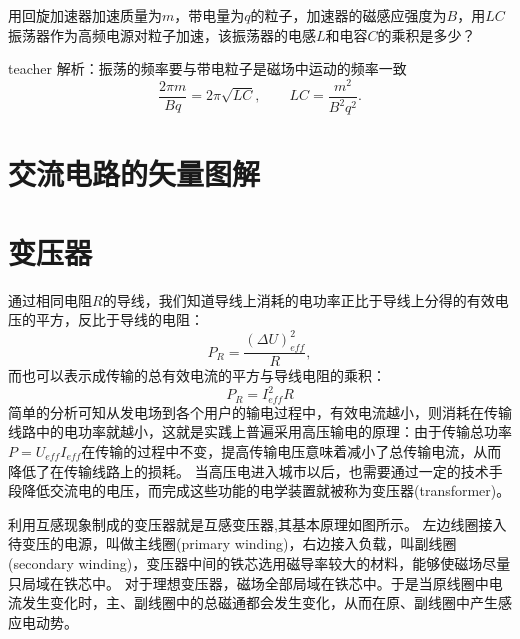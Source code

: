 \begin{example}

用回旋加速器加速质量为$m$，带电量为$q$的粒子，加速器的磁感应强度为$B$，用$LC$振荡器作为高频电源对粒子加速，该振荡器的电感$L$和电容$C$的乘积是多少？
\begin{taggedblock}{teacher}
\noindent
解析：振荡的频率要与带电粒子是磁场中运动的频率一致
\[
\frac{2 \pi m}{B q} = 2\pi \sqrt{LC},\qquad LC = \frac{m^2}{B^2q^2}.
\]
\end{taggedblock}
\end{example}

\section{交流电路的矢量图解}

\section{变压器}
通过相同电阻$R$的导线，我们知道导线上消耗的电功率正比于导线上分得的有效电压的平方，反比于导线的电阻：
\begin{equation}
P_R = \frac{(\Delta U)_{eff}^2}{R},
\end{equation}
而也可以表示成传输的总有效电流的平方与导线电阻的乘积：
\begin{equation}
P_R = I_{eff}^2 R
\end{equation}
简单的分析可知从发电场到各个用户的输电过程中，有效电流越小，则消耗在传输线路中的电功率就越小，这就是实践上普遍采用高压输电的原理：由于传输总功率$P=U_{eff} I_{eff}$在传输的过程中不变，提高传输电压意味着减小了总传输电流，从而降低了在传输线路上的损耗。
当高压电进入城市以后，也需要通过一定的技术手段降低交流电的电压，而完成这些功能的电学装置就被称为{\heiti 变压器}(transformer)。

利用互感现象制成的变压器就是互感变压器,其基本原理如图所示。
左边线圈接入待变压的电源，叫做{\heiti 主线圈}(primary winding)，右边接入负载，叫{\heiti 副线圈}(secondary winding)，变压器中间的铁芯选用磁导率较大的材料，能够使磁场尽量只局域在铁芯中。
对于理想变压器，磁场全部局域在铁芯中。于是当原线圈中电流发生变化时，主、副线圈中的总磁通都会发生变化，从而在原、副线圈中产生感应电动势。

